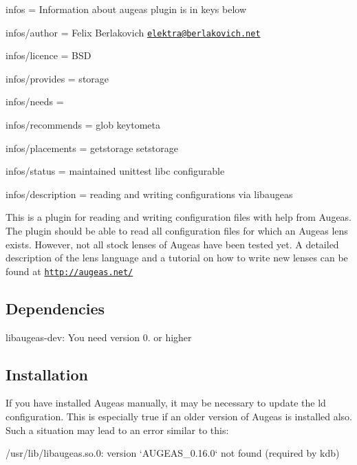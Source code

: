 
\begin{DoxyItemize}
\item infos = Information about augeas plugin is in keys below
\item infos/author = Felix Berlakovich \href{mailto:elektra@berlakovich.net}{\tt elektra@berlakovich.\+net}
\item infos/licence = B\+S\+D
\item infos/provides = storage
\item infos/needs =
\item infos/recommends = glob keytometa
\item infos/placements = getstorage setstorage
\item infos/status = maintained unittest libc configurable
\item infos/description = reading and writing configurations via libaugeas
\end{DoxyItemize}

This is a plugin for reading and writing configuration files with help from Augeas. The plugin should be able to read all configuration files for which an Augeas lens exists. However, not all stock lenses of Augeas have been tested yet. A detailed description of the lens language and a tutorial on how to write new lenses can be found at \href{http://augeas.net/}{\tt http\+://augeas.\+net/}

\subsection*{Dependencies}


\begin{DoxyItemize}
\item {\ttfamily libaugeas-\/dev}\+: You need version 0. or higher
\end{DoxyItemize}

\subsection*{Installation}

If you have installed Augeas manually, it may be necessary to update the ld configuration. This is especially true if an older version of Augeas is installed also. Such a situation may lead to an error similar to this\+: \begin{DoxyVerb}/usr/lib/libaugeas.so.0: version `AUGEAS_0.16.0` not found (required by kdb)
\end{DoxyVerb}


